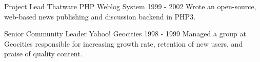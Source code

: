 \begin{cventries}

\cventry
{Project Lead}
{Thatware PHP Weblog System}
{}
{1999 - 2002} %
{ %
Wrote an open-source, web-based news publishing and discussion backend in PHP3.
}


\cventry
{Senior Community Leader}
{Yahoo! Geocities}
{}
{1998 - 1999} %
{ %
Managed a group at Geocities responsible for increasing growth rate, retention of new users, and praise of quality content.
}


\end{cventries}
